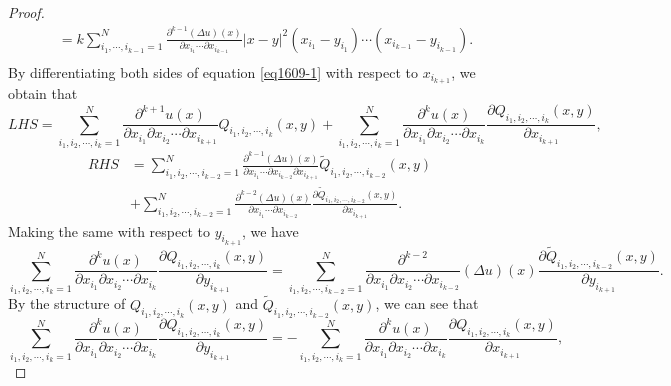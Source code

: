 \documentclass[11pt,reqno]{article}
\numberwithin{equation}{section}
\newcommand{\Ma}{\color{blue}}
\begin{document}
\begin{proof}
\begin{equation}
\begin{aligned}
						&=k\sum_{i_1,\cdots,i_{k-1}=1}^{N}\frac{\partial^{k-1} (\Delta u)(x)}{\partial x_{i_1} \cdots \partial x_{i_{k-1}} }|x-y|^2(x_{i_1}-y_{i_1})\cdots(x_{i_{k-1}}-y_{i_{k-1}}).\\
					\end{aligned}
				\end{equation}
				By differentiating both sides of equation \eqref{eq1609-1} with respect to $x_{i_{k+1}}$, we obtain that 
				\begin{equation}\label{eq1609-2}
					LHS=	\sum_{i_1,i_2,\cdots,i_k=1}^{N}\frac{\partial^{k+1} u(x)}{\partial x_{i_1} \partial x_{i_2}\cdots \partial x_{i_{k+1}}}Q_{i_1,i_2,\cdots,i_k}(x,y)+\sum_{i_1,i_2,\cdots,i_k=1}^{N}\frac{\partial^{k} u(x)}{\partial x_{i_1} \partial x_{i_2}\cdots \partial x_{i_{k}}}\frac{\partial Q_{i_1,i_2,\cdots,i_k}(x,y)}{\partial x_{i_{k+1}}},
				\end{equation}
				\begin{equation}\label{eq1609-3}
					\begin{aligned}
						RHS&=	\sum_{i_1,i_2,\cdots,i_{k-2}=1}^{N}\frac{\partial^{k-1}(\Delta u)(x)}{\partial x_{i_1}\cdots \partial x_{i_{k-2}}\partial x_{i_{k+1}}}  \widetilde{Q}_{i_1,i_2,\cdots,i_{k-2}}(x,y)\\
						&+\sum_{i_1,i_2,\cdots,i_{k-2}=1}^{N}\frac{\partial^{k-2}(\Delta u)(x)}{\partial x_{i_1}\cdots \partial x_{i_{k-2}}} \frac{\partial\widetilde{Q}_{i_1,i_2,\cdots,i_{k-2}}(x,y)}{\partial x_{i_{k+1}}}.
					\end{aligned}
				\end{equation}
				Making the same with respect to $y_{i_{k+1}}$, we have
				\begin{equation}\label{eq1609-4}
					\sum_{i_1,i_2,\cdots,i_k=1}^{N}\frac{\partial^k u(x)}{\partial x_{i_1} \partial x_{i_2}\cdots \partial x_{i_k}}\frac{\partial Q_{i_1,i_2,\cdots,i_k}(x,y)}{\partial y_{i_{k+1}} }=	\sum_{i_1,i_2,\cdots,i_{k-2}=1}^{N}\frac{\partial^{k-2}}{\partial x_{i_1} \partial x_{i_2}\cdots \partial x_{i_{k-2}}} (\Delta u)(x) \frac{\partial\widetilde{Q}_{i_1,i_2,\cdots,i_{k-2}}(x,y)}{\partial y_{i_{k+1}} }.
				\end{equation}
			By the structure of $Q_{i_1,i_2,\cdots,i_k}(x,y)$ and $\widetilde{Q}_{i_1,i_2,\cdots,i_{k-2}}(x,y)$, we can see that
				\begin{equation}\label{eq1609-5}
					\sum_{i_1,i_2,\cdots,i_k=1}^{N}\frac{\partial^k u(x)}{\partial x_{i_1} \partial x_{i_2}\cdots \partial x_{i_k}}\frac{\partial Q_{i_1,i_2,\cdots,i_k}(x,y)}{\partial y_{i_{k+1}} }=	-\sum_{i_1,i_2,\cdots,i_k=1}^{N}\frac{\partial^k u(x)}{\partial x_{i_1} \partial x_{i_2}\cdots \partial x_{i_k}}\frac{\partial Q_{i_1,i_2,\cdots,i_k}(x,y)}{\partial x_{i_{k+1}} },

\end{equation}
\end{proof}
\end{document}
